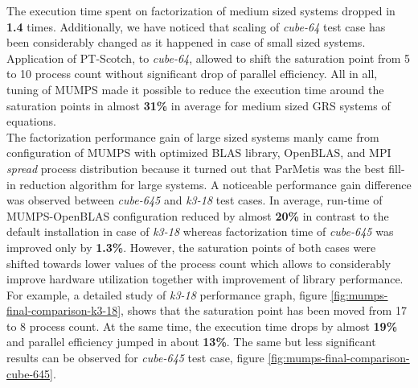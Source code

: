 The execution time spent on factorization of medium sized systems dropped in \textbf{1.4} times. Additionally, we have noticed that scaling of \textit{cube-64} test case has been considerably changed as it happened in case of small sized systems. Application of PT-Scotch, to \textit{cube-64}, allowed to shift the saturation point from 5 to 10 process count without significant drop of parallel efficiency. All in all, tuning of MUMPS made it possible to reduce the execution time around the saturation points in almost \textbf{31\%} in average for medium sized GRS systems of equations.\\


The factorization performance gain of large sized systems manly came from configuration of MUMPS with optimized BLAS library, OpenBLAS, and MPI \textit{spread} process distribution because it turned out that ParMetis was the best fill-in reduction algorithm for large systems. A noticeable performance gain difference was observed between \textit{cube-645} and \textit{k3-18} test cases. In average, run-time of MUMPS-OpenBLAS configuration reduced by almost \textbf{20\%} in contrast to the default installation in case of \textit{k3-18} whereas factorization time of \textit{cube-645} was improved only by 
\textbf{1.3\%}. However, the saturation points of both cases were shifted towards lower values of the process count which allows to considerably improve hardware utilization  together with improvement of library performance. For example, a detailed study of \textit{k3-18} performance graph, figure \ref{fig:mumps-final-comparison-k3-18}, shows that the saturation point has been moved from 17 to 8 process count. At the same time, the execution time drops by almost \textbf{19\%} and parallel efficiency jumped in about \textbf{13\%}. The same but less significant results can be observed for \textit{cube-645} test case, figure \ref{fig:mumps-final-comparison-cube-645}. \\




\newpage